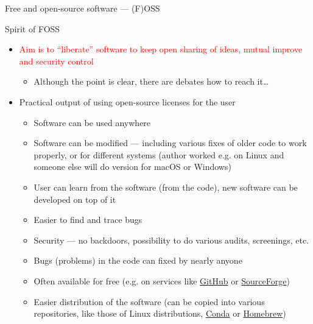\documentclass[compress, ucs, xelatex, 11pt, xcolor=svgnames, aspectratio=169,
	hyperref={
		bookmarks=true,
		unicode=true,
		colorlinks=true,
		pdftitle={Linux, command line and MetaCentrum},
		plainpages=false,
		pdfauthor={Vojtech Zeisek},
		pdfsubject={Course about use of Linux command line, writing shell scripts and using MetaCentrum of CESNET},
		pdfcreator={XeLaTeX},
		pdfkeywords={Linux, GNU, BASH, shell, command line, MetaCentrum},
		linkcolor=DarkRed, %
		anchorcolor=DarkBlue, %
		citecolor=Indigo, %
		filecolor=NavyBlue, %
		menucolor=DarkMagenta, %
		urlcolor=DarkBlue, %
		pdftex},
	url={hyphens, lowtilde} %
	]{beamer}
\renewcommand{\alert}[1]{\textcolor{red}{#1}}
\begin{document}
\begin{frame}[allowframebreaks]{Free and open-source software --- (F)OSS}
\begin{block}{Spirit of FOSS}
\begin{itemize}
			\item \alert{Aim is to \enquote{liberate} software to keep open sharing of ideas, mutual improve and security control}
			\begin{itemize}
				\item Although the point is clear, there are debates how to reach it\ldots
			\end{itemize}
		\end{itemize}
	\end{block}
	\begin{itemize}
		\item Practical output of using open-source licenses for the user
		\begin{itemize}
			\item Software can be used anywhere
			\item Software can be modified --- including various fixes of older code to work properly, or for different systems (author worked e.g. on Linux and someone else will do version for macOS or Windows)
			\item User can learn from the software (from the code), new software can be developed on top of it
			\item Easier to find and trace bugs
			\item Security --- no backdoors, possibility to do various audits, screenings, etc.
			\item Bugs (problems) in the code can fixed by nearly anyone
			\item Often available for free (e.g. on services like \href{https://github.com/}{GitHub} or \href{https://sourceforge.net/}{SourceForge})
			\item Easier distribution of the software (can be copied into various repositories, like those of Linux distributions, \href{https://docs.conda.io/}{Conda} or \href{https://brew.sh/}{Homebrew})
		\end{itemize}
	\end{itemize}
\end{frame}
\end{document}
